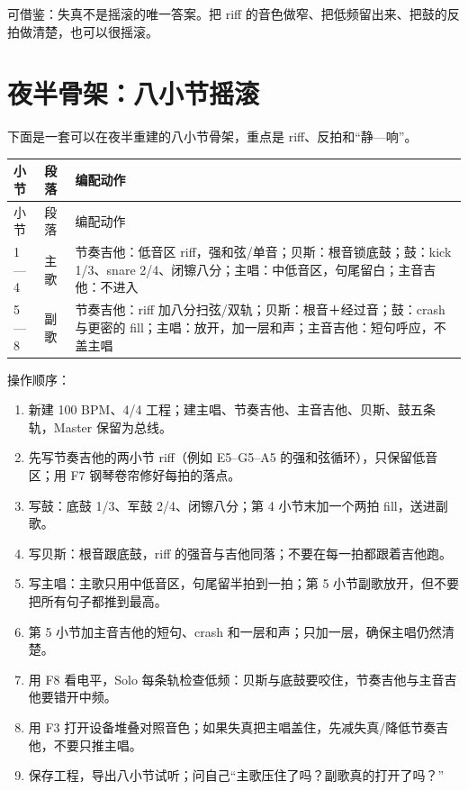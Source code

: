 可借鉴：失真不是摇滚的唯一答案。把 riff 的音色做窄、把低频留出来、把鼓的反拍做清楚，也可以很摇滚。

\section{夜半骨架：八小节摇滚}
\label{sec:rock-yeban}

下面是一套可以在夜半重建的八小节骨架，重点是 riff、反拍和“静—响”。

\begin{longtable}{p{}p{}p{}}
\toprule
小节 & 段落 & 编配动作 \\
\midrule
\endfirsthead
\toprule
小节 & 段落 & 编配动作 \\
\midrule
\endhead
1—4 & 主歌 & 节奏吉他：低音区 riff，强和弦/单音；贝斯：根音锁底鼓；鼓：kick 1/3、snare 2/4、闭镲八分；主唱：中低音区，句尾留白；主音吉他：不进入 \\
5—8 & 副歌 & 节奏吉他：riff 加八分扫弦/双轨；贝斯：根音＋经过音；鼓：crash 与更密的 fill；主唱：放开，加一层和声；主音吉他：短句呼应，不盖主唱 \\
\bottomrule
\end{longtable}

操作顺序：

\begin{enumerate}
\item 新建 100 BPM、4/4 工程；建主唱、节奏吉他、主音吉他、贝斯、鼓五条轨，Master 保留为总线。
\item 先写节奏吉他的两小节 riff（例如 E5–G5–A5 的强和弦循环），只保留低音区；用 F7 钢琴卷帘修好每拍的落点。
\item 写鼓：底鼓 1/3、军鼓 2/4、闭镲八分；第 4 小节末加一个两拍 fill，送进副歌。
\item 写贝斯：根音跟底鼓，riff 的强音与吉他同落；不要在每一拍都跟着吉他跑。
\item 写主唱：主歌只用中低音区，句尾留半拍到一拍；第 5 小节副歌放开，但不要把所有句子都推到最高。
\item 第 5 小节加主音吉他的短句、crash 和一层和声；只加一层，确保主唱仍然清楚。
\item 用 F8 看电平，Solo 每条轨检查低频：贝斯与底鼓要咬住，节奏吉他与主音吉他要错开中频。
\item 用 F3 打开设备堆叠对照音色；如果失真把主唱盖住，先减失真/降低节奏吉他，不要只推主唱。
\item 保存工程，导出八小节试听；问自己“主歌压住了吗？副歌真的打开了吗？”
\end{enumerate}

